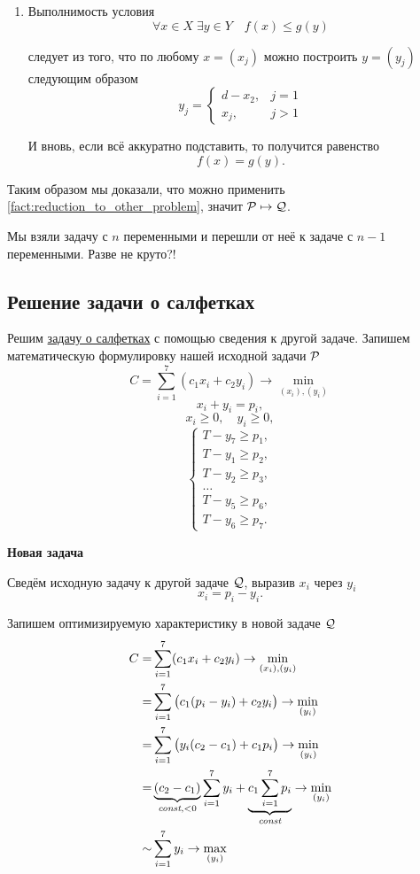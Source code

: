 \begin{enumerate}[nosep]
\begin{enumerate}
		\item Выполнимость условия
		\[
		\forall x \in X \; \exists y \in Y \quad f(x) \le g(y)
		\]
		
		следует из того, что по любому $x = (x_j)$ можно построить $y = (y_j)$ следующим образом
		\[
		y_j = \begin{cases}
			d - x_2,& j = 1 \\
			x_j,& j > 1
		\end{cases}
		\]
		
		И вновь, если всё аккуратно подставить, то получится равенство
		\[
		f(x) = g(y).
		\]
	\end{enumerate}
\end{enumerate}

Таким образом мы доказали, что можно применить \cref{fact:reduction_to_other_problem}, значит $\P \mapsto \Q$.

Мы взяли задачу с $n$ переменными и перешли от неё к задаче с $n-1$ переменными. Разве не круто?!

\subsection{Решение задачи о салфетках}

Решим \hyperref[pr:napkins]{задачу о салфетках} с помощью сведения к другой задаче. Запишем математическую формулировку нашей исходной задачи $\P$
\[
C = \sum_{i=1}^7 (c_1 x_i + c_2 y_i) \to \min_{(x_i), (y_i)}
\]
\[
x_i + y_i = p_i,
\]
\[
x_i \ge 0, \quad y_i \ge 0,
\]
\[
\begin{cases}
	T - y_7 \ge p_1, \\
	T - y_1 \ge p_2, \\
	T - y_2 \ge p_3, \\
	\dots \\
	T - y_5 \ge p_6, \\
	T - y_6 \ge p_7.
\end{cases}
\]

\bigskip

\textbf{Новая задача}

Сведём исходную задачу к другой задаче $\Q$, выразив $x_i$ через $y_i$
\[
x_i = p_i - y_i.
\]

Запишем оптимизируемую характеристику в новой задаче $\Q$
\begin{align*}
	C =& \sum_{i=1}^7 (c_1 x_i + c_2 y_i) \to \min_{(x_i), (y_i)} \\
	=& \sum_{i=1}^7 \big(c_1 (p_i - y_i) + c_2 y_i\big) \to \min_{(y_i)} \\
	=&  \sum_{i=1}^7 \big(y_i (c_2 - c_1) + c_1 p_i\big) \to \min_{(y_i)} \\
	=& \underbrace{(c_2 - c_1)}_{\const, <0} \sum_{i=1}^7 y_i + \underbrace{c_1 \sum_{i=1}^{7} p_i}_{\const} \to \min_{(y_i)} \\
	\sim& \sum_{i=1}^7 y_i \to \max_{(y_i)}
\end{align*}


